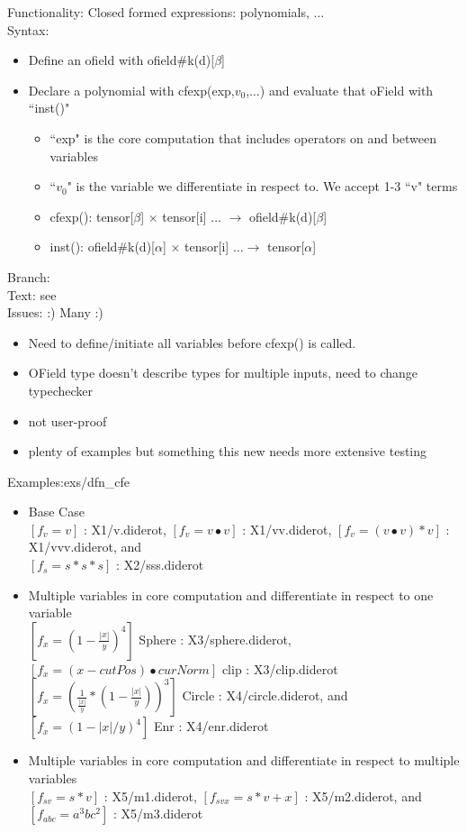 \noindent
Functionality: Closed formed expressions: polynomials, $\dots$\\
{Syntax}: 
\begin{itemize}[noitemsep]
\item Define an ofield  with ofield\#k(d)[$\beta$]
\item Declare a polynomial with cfexp(exp,$v_0$,$\dots$) and  evaluate that oField with ``inst()"
\begin{itemize}[noitemsep]
\item ``exp" is the core computation that includes operators on and between variables
\item ``$v_0$" is the variable we differentiate in respect to. We accept 1-3 ``v" terms
\item  cfexp(): tensor[$\beta$] $\times$  tensor[i] $\dots $   $\rightarrow$ ofield\#k(d)[$\beta$] 
\item inst(): ofield\#k(d)[$\alpha$] $\times$ tensor[i] $ \dots\rightarrow$ tensor[$\alpha$] 
\end{itemize}
\end{itemize}
{Branch}: \branch{}\\
{Text}: see \doc{} \\
{Issues}: :) Many :)
\begin{itemize}[noitemsep]
\item Need to define/initiate all variables before cfexp() is called.
\item OField type doesn't describe types for multiple inputs, need to change typechecker 
\item not user-proof
\item plenty of examples but something this new needs more extensive testing
\end{itemize}
{Examples}:exs{}/dfn\_cfe
\begin{itemize}[noitemsep]
\item  Base Case \\
$[f_v = v]$ : X1/v.diderot, 
$[f_v = v\bullet v]$  : X1/vv.diderot, 
$[f_v = (v\bullet v)*v]$ : X1/vvv.diderot, and  \\
$[f_s = s*s*s]$ : X2/sss.diderot
\item  Multiple variables in core computation and differentiate in respect to one variable \\
$[f_x= (1-\frac{|x|}{y})^4]$  Sphere : X3/sphere.diderot,
$[f_x= (x-cutPos)\bullet curNorm]$ clip : X3/clip.diderot\\
$[f_x =  (\frac{1}{\frac{|x|}{y}}*(1-\frac{|x|}{y}))^3]$ Circle  : X4/circle.diderot, and 
$[f_x= (1-|x|/y)^4]$ Enr : X4/enr.diderot\\

 \item  Multiple variables in core computation and differentiate in respect to multiple variables\\
$[f_{sv} = s*v]$  : X5/m1.diderot,
$[f_{svx} = s*v+x]$  : X5/m2.diderot, and
$[f_{abc} = a^3bc^2]$  : X5/m3.diderot\\

\end{itemize}
